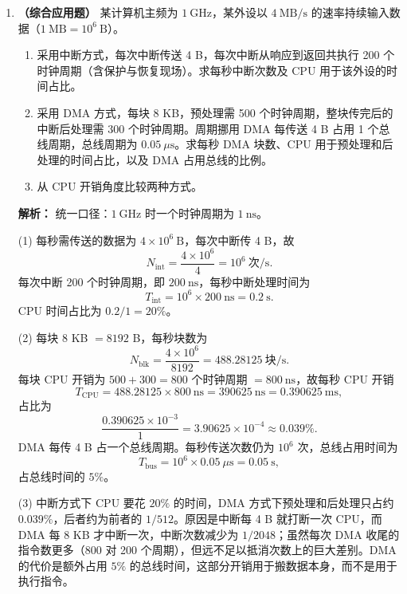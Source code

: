 \begin{enumerate}
\item \textbf{（综合应用题）} 某计算机主频为 $1\ \mathrm{GHz}$，某外设以 $4\ \mathrm{MB/s}$ 的速率持续输入数据（$1\ \mathrm{MB}=10^{6}\ \mathrm{B}$）。
\begin{enumerate}
\item[(1)] 采用中断方式，每次中断传送 4 B，每次中断从响应到返回共执行 200 个时钟周期（含保护与恢复现场）。求每秒中断次数及 CPU 用于该外设的时间占比。
\item[(2)] 采用 DMA 方式，每块 8 KB，预处理需 500 个时钟周期，整块传完后的中断后处理需 300 个时钟周期。周期挪用 DMA 每传送 4 B 占用 1 个总线周期，总线周期为 $0.05\ \mu\mathrm{s}$。求每秒 DMA 块数、CPU 用于预处理和后处理的时间占比，以及 DMA 占用总线的比例。
\item[(3)] 从 CPU 开销角度比较两种方式。
\end{enumerate}

\ifshowsolutions\par\noindent\textbf{解析：} 统一口径：$1\ \mathrm{GHz}$ 时一个时钟周期为 $1\ \mathrm{ns}$。

(1) 每秒需传送的数据为 $4\times10^{6}\ \mathrm{B}$，每次中断传 4 B，故
\[
N_{\text{int}}=\frac{4\times10^{6}}{4}=10^{6}\ \text{次/s}.
\]
每次中断 200 个时钟周期，即 $200\ \mathrm{ns}$，每秒中断处理时间为
\[
T_{\text{int}}=10^{6}\times200\ \mathrm{ns}=0.2\ \mathrm{s}.
\]
CPU 时间占比为 $0.2/1=20\%$。

(2) 每块 8 KB $=8192$ B，每秒块数为
\[
N_{\text{blk}}=\frac{4\times10^{6}}{8192}=488.28125\ \text{块/s}.
\]
每块 CPU 开销为 $500+300=800$ 个时钟周期 $=800\ \mathrm{ns}$，故每秒 CPU 开销
\[
T_{\text{CPU}}=488.28125\times800\ \mathrm{ns}
=390625\ \mathrm{ns}
=0.390625\ \mathrm{ms},
\]
占比为
\[
\frac{0.390625\times10^{-3}}{1}=3.90625\times10^{-4}\approx0.039\%.
\]
DMA 每传 4 B 占一个总线周期。每秒传送次数仍为 $10^{6}$ 次，总线占用时间为
\[
T_{\text{bus}}=10^{6}\times0.05\ \mu\mathrm{s}
=0.05\ \mathrm{s},
\]
占总线时间的 $5\%$。

(3) 中断方式下 CPU 要花 $20\%$ 的时间，DMA 方式下预处理和后处理只占约 $0.039\%$，后者约为前者的 $1/512$。原因是中断每 4 B 就打断一次 CPU，而 DMA 每 8 KB 才中断一次，中断次数减少为 $1/2048$；虽然每次 DMA 收尾的指令数更多（800 对 200 个周期），但远不足以抵消次数上的巨大差别。DMA 的代价是额外占用 $5\%$ 的总线时间，这部分开销用于搬数据本身，而不是用于执行指令。\par\noindent
{}\else \answerarea[10] \fi


\end{enumerate}
